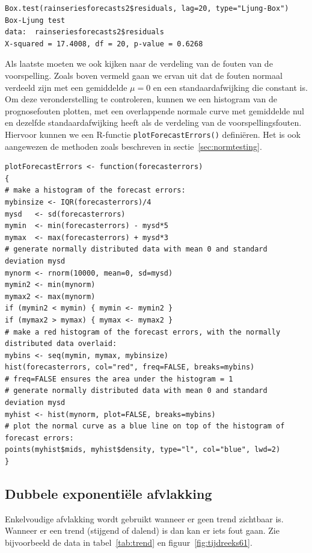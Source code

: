 
\begin{lstlisting}
Box.test(rainseriesforecasts2$residuals, lag=20, type="Ljung-Box")
Box-Ljung test
data:  rainseriesforecasts2$residuals
X-squared = 17.4008, df = 20, p-value = 0.6268
\end{lstlisting}

Als laatste moeten we ook kijken naar de verdeling van de fouten van de voorspelling. Zoals boven vermeld gaan we ervan uit dat de fouten normaal verdeeld zijn met een gemiddelde $\mu = 0$ en een standaardafwijking die constant is. Om deze veronderstelling te controleren, kunnen we een histogram van de prognosefouten plotten, met een overlappende normale curve met gemiddelde nul en dezelfde standaardafwijking heeft als de verdeling van de voorspellingsfouten. Hiervoor kunnen we een R-functie \texttt{plotForecastErrors()} definiëren. Het is ook aangewezen de methoden zoals beschreven in sectie~\ref{sec:normtesting}.


\begin{lstlisting}
plotForecastErrors <- function(forecasterrors)
{
# make a histogram of the forecast errors:
mybinsize <- IQR(forecasterrors)/4
mysd   <- sd(forecasterrors)
mymin  <- min(forecasterrors) - mysd*5
mymax  <- max(forecasterrors) + mysd*3
# generate normally distributed data with mean 0 and standard deviation mysd
mynorm <- rnorm(10000, mean=0, sd=mysd)
mymin2 <- min(mynorm)
mymax2 <- max(mynorm)
if (mymin2 < mymin) { mymin <- mymin2 }
if (mymax2 > mymax) { mymax <- mymax2 }
# make a red histogram of the forecast errors, with the normally distributed data overlaid:
mybins <- seq(mymin, mymax, mybinsize)
hist(forecasterrors, col="red", freq=FALSE, breaks=mybins)
# freq=FALSE ensures the area under the histogram = 1
# generate normally distributed data with mean 0 and standard deviation mysd
myhist <- hist(mynorm, plot=FALSE, breaks=mybins)
# plot the normal curve as a blue line on top of the histogram of forecast errors:
points(myhist$mids, myhist$density, type="l", col="blue", lwd=2)
}
\end{lstlisting}

\subsection{Dubbele exponentiële afvlakking}

Enkelvoudige afvlakking wordt gebruikt wanneer er geen trend zichtbaar is. Wanneer er een trend (stijgend of dalend) is dan kan er iets fout gaan. Zie bijvoorbeeld de data in tabel~\ref{tab:trend} en figuur~\ref{fig:tijdreeks61}.


